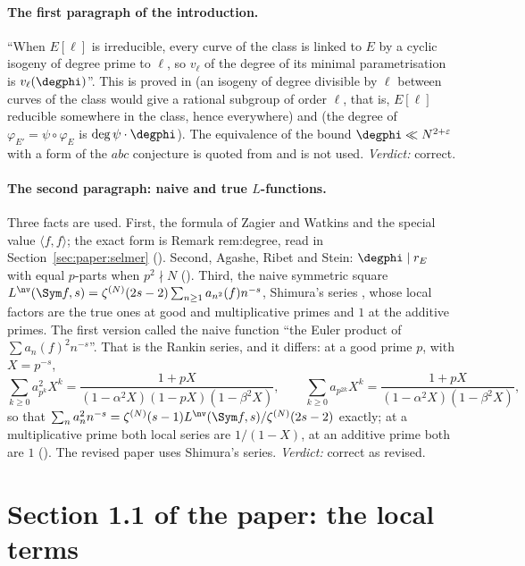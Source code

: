 \begin{sloppypar}
\paragraph{The first paragraph of the introduction.} ``When $E[\ell]$ is irreducible, every curve of the class is linked to $E$ by a cyclic isogeny of
degree prime to $\ell$, so $v_\ell$ of the degree of its minimal parametrisation is $v_\ell(\degphi)$''. This is proved in  (an isogeny of
degree divisible by $\ell$ between curves of the class would give a rational subgroup of order $\ell$, that is, $E[\ell]$ reducible somewhere in the class,
hence everywhere) and  (the degree of $\varphi_{E'}=\psi\circ\varphi_E$ is $\deg\psi\cdot\degphi$). The equivalence of the bound $\degphi\ll N^{2+\varepsilon}$
with a form of the $abc$ conjecture is quoted from \cite[Section 2]{ARS12} and is not used. \emph{Verdict:} correct.

\paragraph{The second paragraph: naive and true $L$-functions.} Three facts are used. First, the formula of Zagier and Watkins and the special value
$\langle f,f\rangle$; the exact form is Remark rem:degree, read in Section~\ref{sec:paper:selmer} (). Second, Agashe, Ribet and Stein:
$\degphi\mid r_E$ with equal $p$-parts when $p^2\nmid N$ (). Third, the naive symmetric square
$L^{\nv}(\Sym f,s)=\zeta^{(N)}(2s-2)\sum_{n\ge1}a_{n^2}(f)n^{-s}$, Shimura's series \cite{Shimura75}, whose local factors are the true ones at good and multiplicative
primes and $1$ at the additive primes. The first version called the naive function ``the Euler product of $\sum a_n(f)^2n^{-s}$''. That is the Rankin
series, and it differs: at a good prime $p$, with $X=p^{-s}$,
\[
\sum_{k\ge0}a_{p^k}^2X^k=\frac{1+pX}{(1-\alpha^2X)(1-pX)(1-\beta^2X)},\qquad\sum_{k\ge0}a_{p^{2k}}X^k=\frac{1+pX}{(1-\alpha^2X)(1-\beta^2X)},
\]
so that $\sum_na_n^2n^{-s}=\zeta^{(N)}(s-1)L^{\nv}(\Sym f,s)/\zeta^{(N)}(2s-2)$ exactly; at a multiplicative prime both local series are $1/(1-X)$, at an additive
prime both are $1$ (). The revised paper uses Shimura's series. \emph{Verdict:} correct as revised.

\section[Paper 1.1: the local terms]{Section 1.1 of the paper: the local terms}\label{sec:paper:local-terms}


\end{sloppypar}
